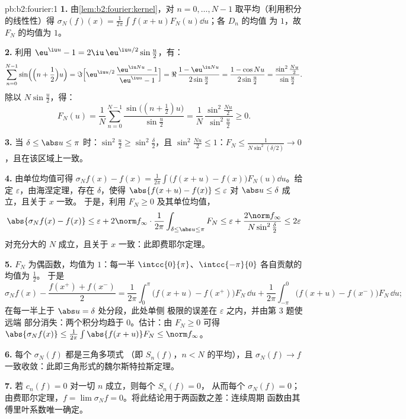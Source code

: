 \begin{solution}{pb:b2:fourier:1}
\textbf{1.} 由\cref{lem:b2:fourier:kernel}，对 $n = 0,
\dots, N-1$ 取平均（利用积分的线性性）得 $\sigma_N(f)(x) =
\frac{1}{2\pi}\int f(x+u)F_N(u)\dd u$；各 $D_n$ 的均值
为 $1$，故 $F_N$ 的均值为 $1$。

\textbf{2.} 利用 $\eu^{\iu u} - 1 = 2\iu\,\eu^{\iu
u/2}\sin\frac u2$，有：
\[
\sum_{n=0}^{N-1}\sin\Bigl(\Bigl(n + \frac12\Bigr)u\Bigr)
= \Im\Bigl[\eu^{\iu u/2}\,\frac{\eu^{\iu Nu} - 1}{\eu^{\iu u}
- 1}\Bigr]
= \Re\,\frac{1 - \eu^{\iu Nu}}{2\sin\frac u2}
= \frac{1 - \cos Nu}{2\sin\frac u2}
= \frac{\sin^2\frac{Nu}2}{\sin\frac u2} .
\]
除以 $N\sin\frac u2$，得：
\[
F_N(u) = \frac1N\sum_{n=0}^{N-1}
\frac{\sin\bigl((n+\frac12)u\bigr)}{\sin\frac u2}
= \frac{1}{N}\,
\frac{\sin^2\frac{Nu}{2}}{\sin^2\frac u2} \geq 0 .
\]

\textbf{3.} 当 $\delta \leq \abs u \leq \pi$ 时：$\sin^2\frac u2
\geq \sin^2\frac\delta2$，且 $\sin^2\frac{Nu}2 \leq 1$：$F_N
\leq \frac{1}{N\sin^2(\delta/2)} \to 0$，且在该区域上一致。

\textbf{4.} 由单位均值可得 $\sigma_Nf(x) - f(x) =
\frac{1}{2\pi}\int\bigl(f(x+u) - f(x)\bigr)F_N(u)\dd u$。给定
$\varepsilon$，由海涅定理，存在 $\delta$，使得 $\abs{f(x+u) - f(x)}
\leq \varepsilon$ 对 $\abs u \leq \delta$ 成立，且关于 $x$ 一致。
于是，利用 $F_N \geq 0$ 及其单位均值，
\[
\abs{\sigma_Nf(x) - f(x)}
\leq \varepsilon +
2\norm f_\infty\cdot\frac{1}{2\pi}
\int_{\delta\leq\abs u\leq\pi}F_N
\leq \varepsilon + \frac{2\norm
f_\infty}{N\sin^2\frac\delta2}
\leq 2\varepsilon
\]
对充分大的 $N$ 成立，且关于 $x$ 一致：此即费耶尔定理。

\textbf{5.} $F_N$ 为偶函数，均值为 $1$：每一半
$\intcc{0}{\pi}$、$\intcc{-\pi}{0}$ 各自贡献的均值为 $\frac12$。
于是
\[
\sigma_Nf(x) - \frac{f(x^+)+f(x^-)}{2}
= \frac{1}{2\pi}\int_0^\pi\bigl(f(x+u) -
f(x^+)\bigr)F_N\,\dd u
+ \frac{1}{2\pi}\int_{-\pi}^0\bigl(f(x+u) -
f(x^-)\bigr)F_N\,\dd u ;
\]
在每一半上于 $\abs u = \delta$ 处分段，此处单侧
极限的误差在 $\varepsilon$ 之内，并由第 3 题使远端
部分消失：两个积分均趋于 $0$。估计：由 $F_N \geq 0$
可得 $\abs{\sigma_Nf(x)} \leq
\frac{1}{2\pi}\int\abs{f(x+u)}F_N \leq \norm f_\infty$。

\textbf{6.} 每个 $\sigma_N(f)$ 都是三角多项式
（即 $S_n(f)$，$n < N$ 的平均），且 $\sigma_N(f) \to f$
一致收敛：此即三角形式的魏尔斯特拉斯定理。

\textbf{7.} 若 $c_n(f) = 0$ 对一切 $n$ 成立，则每个 $S_n(f) = 0$，
从而每个 $\sigma_N(f) = 0$；由费耶尔定理，$f = \lim\sigma_Nf =
0$。将此结论用于两函数之差：连续周期
函数由其傅里叶系数唯一确定。


\end{solution}
